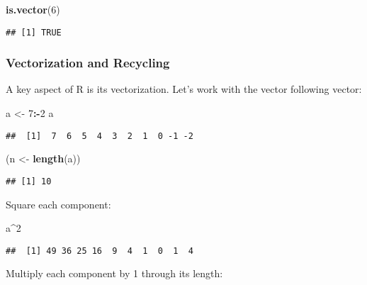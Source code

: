 \documentclass[]{article}
\newenvironment{Shaded}{\begin{snugshade}}{\end{snugshade}}
\newcommand{\KeywordTok}[1]{\textcolor[rgb]{0.13,0.29,0.53}{\textbf{#1}}}
\newcommand{\DecValTok}[1]{\textcolor[rgb]{0.00,0.00,0.81}{#1}}
\newcommand{\StringTok}[1]{\textcolor[rgb]{0.31,0.60,0.02}{#1}}
\newcommand{\OperatorTok}[1]{\textcolor[rgb]{0.81,0.36,0.00}{\textbf{#1}}}
\newcommand{\NormalTok}[1]{#1}
\begin{document}
\begin{Shaded}
\begin{Highlighting}[]
\KeywordTok{is.vector}\NormalTok{(}\DecValTok{6}\NormalTok{)}
\end{Highlighting}
\end{Shaded}

\begin{verbatim}
## [1] TRUE
\end{verbatim}

\subsubsection{Vectorization and
Recycling}\label{vectorization-and-recycling}

A key aspect of R is its vectorization. Let's work with the vector
following vector:

\begin{Shaded}
\begin{Highlighting}[]
\NormalTok{a <-}\StringTok{ }\DecValTok{7}\OperatorTok{:-}\DecValTok{2}
\NormalTok{a}
\end{Highlighting}
\end{Shaded}

\begin{verbatim}
##  [1]  7  6  5  4  3  2  1  0 -1 -2
\end{verbatim}

\begin{Shaded}
\begin{Highlighting}[]
\NormalTok{(n <-}\StringTok{ }\KeywordTok{length}\NormalTok{(a))}
\end{Highlighting}
\end{Shaded}

\begin{verbatim}
## [1] 10
\end{verbatim}

Square each component:

\begin{Shaded}
\begin{Highlighting}[]
\NormalTok{a}\OperatorTok{^}\DecValTok{2}
\end{Highlighting}
\end{Shaded}

\begin{verbatim}
##  [1] 49 36 25 16  9  4  1  0  1  4
\end{verbatim}

Multiply each component by 1 through its length:
\end{document}
